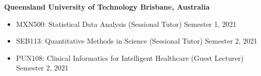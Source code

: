 \textbf{Queensland University of Technology \hfill Brisbane, Australia}\par
\begin{itemize}
	\item MXN500: Statistical Data Analysis (Sessional Tutor) \hfill Semester 1, 2021
	\item SEB113: Quantitative Methods in Science (Sessional Tutor) \hfill Semester 2, 2021
    \item PUN108: Clinical Informatics for Intelligent Healthcare (Guest Lecturer) \hfill Semester 2, 2021\par

\end{itemize}\par